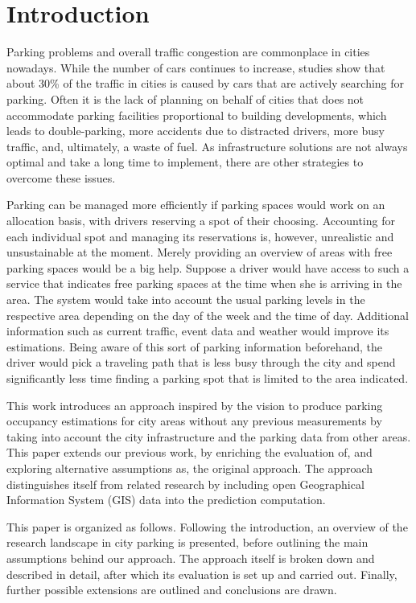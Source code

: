 \section{Introduction}
	Parking problems and overall traffic congestion are commonplace in cities nowadays. While the number of cars continues to increase\cite{car_increase}, studies show that about 30\% of the traffic in cities is caused by cars that are actively searching for parking\cite{traffic_congestion}. Often it is the lack of planning on behalf of cities that does not accommodate parking facilities proportional to building developments, which leads to double-parking, more accidents due to distracted drivers, more busy traffic, and, ultimately, a waste of fuel\cite{inrix_study}. As infrastructure solutions are not always optimal and take a long time to implement, there are other strategies to overcome these issues.
	
	Parking can be managed more efficiently if parking spaces would work on an allocation basis, with drivers reserving a spot of their choosing. Accounting for each individual spot and managing its reservations is, however, unrealistic and unsustainable at the moment. Merely providing an overview of areas with free parking spaces would be a big help. Suppose a driver would have access to such a service that indicates free parking spaces at the time when she is arriving in the area. The system would take into account the usual parking levels in the respective area depending on the day of the week and the time of day. Additional information such as current traffic, event data and weather would improve its estimations. Being aware of this sort of parking information beforehand, the driver would pick a traveling path that is less busy through the city and spend significantly less time finding a parking spot that is limited to the area indicated.
	
	This work introduces an approach inspired by the vision to produce parking occupancy estimations for city areas without any previous measurements by taking into account the city infrastructure and the parking data from other areas. This paper extends our previous work\cite{ionita2018park,ionita2017master}, by enriching the evaluation of, and exploring alternative assumptions as, the original approach. The approach distinguishes itself from related research by including open Geographical Information System (GIS) data into the prediction computation.
	
	This paper is organized as follows. Following the introduction, an overview of the research landscape in city parking is presented, before outlining the main assumptions behind our approach. The approach itself is broken down and described in detail, after which its evaluation is set up and carried out. Finally, further possible extensions are outlined and conclusions are drawn.

